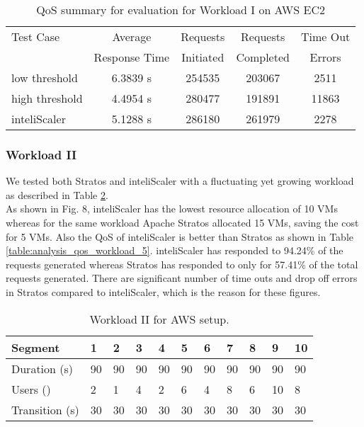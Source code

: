 \begin{table}[h!]
\centering
\caption{QoS summary for evaluation for Workload I on AWS EC2}
\label{table:analysis_qos_workload_3}
\begin{tabular}{|l|c|c|c|c|}
\hline

Test Case & Average & Requests & Requests & Time Out  \\
& Response Time & Initiated & Completed & Errors\\ \hline

low threshold & 6.3839 s & 254535 & 203067 & 2511\\ \hline

high threshold & 4.4954 s & 280477 & 191891  & 11863\\ \hline

inteliScaler & 5.1288 s & 286180 & 261979  & 2278\\ \hline

\end{tabular}
\end{table}

\subsubsection{Workload II}
We tested both Stratos and inteliScaler with a fluctuating yet growing workload as described in Table \ref{table:workload_5}.\\

As shown in Fig. 8, inteliScaler has the lowest resource allocation of 10 VMs whereas for the same workload Apache Stratos allocated 15 VMs, saving the cost for 5 VMs. Also the QoS of inteliScaler is better than Stratos as shown in Table \ref{table:analysis_qos_workload_5}. inteliScaler has responded to 94.24\% of the requests generated whereas Stratos has responded to only for 57.41\% of the total requests generated. There are significant number of time outs and drop off errors in Stratos compared to inteliScaler, which is the reason for these figures.\\

\begin{table}[h!]
\centering
\caption{Workload II for AWS setup.}
\label{table:workload_5}
\begin{tabular}{|l|l|l|l|l|l|l|l|l|l|l|}
\hline
Segment & 1 & 2 & 3 & 4 & 5 & 6 & 7 & 8 & 9 & 10\\ \hline
Duration (s) & 90 & 90 & 90 & 90 & 90 & 90 & 90 & 90 & 90 & 90 \\ \hline
Users (\times100) & 2 & 1 & 4 & 2 & 6 & 4 & 8 & 6 & 10 & 8   \\ \hline
Transition (s) & 30 & 30 & 30 & 30 & 30 & 30 & 30 & 30 & 30 & 30  \\ \hline
\end{tabular}
\end{table}